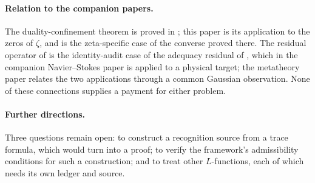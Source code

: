 \paragraph{Relation to the companion papers.}
The duality-confinement theorem is proved in \citet{TsiokosSDTC2026};
this paper is its application to the zeros of \(\zeta\), and
 is the zeta-specific case of the
converse proved there.  The residual operator of  is the
identity-audit case of the adequacy residual of
\citet{TsiokosXiCompanion2026}, which in the companion Navier--Stokes
paper \citep{TsiokosNavier2026} is applied to a physical target; the
metatheory paper \citep{TsiokosMetaTheory2026} relates the two
applications through a common Gaussian observation.  None of these
connections supplies a payment for either problem.

\paragraph{Further directions.}
Three questions remain open: to construct a recognition source from a
trace formula, which would turn  into a
proof; to verify the framework's admissibility conditions for such a
construction; and to treat other \(L\)-functions, each of which needs
its own ledger and source.
